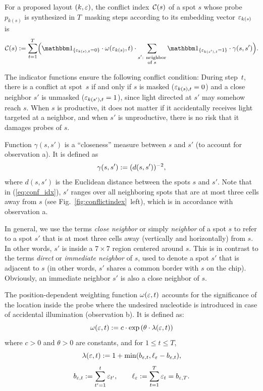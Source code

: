 For a proposed layout $(k,\varepsilon)$, the conflict index~${\mathcal{C}}(s)$ of a spot $s$
whose probe $p_{k(s)}$ is synthesized in $T$~masking steps according to its
embedding vector $\varepsilon_{k(s)}$ is
\begin{equation}
\label{eq:conf_idx}
\CalC(s) := \sum_{t=1}^{T} \Bigl(
  \Ind{\eps_{k(s),t}=0}
  \cdot \omega(\eps_{k(s)},t)
  \cdot \sum_{\substack{s'\text{: neighbor}\\\text{of } s}}
  \Ind{\eps_{k(s'),t}=1}
  \cdot \gamma(s,s') \Bigr).
\end{equation}

The indicator functions ensure the following conflict condition: During
step~$t$, there is a conflict at spot~$s$ if and only if $s$ is masked
($\varepsilon_{k(s),t}=0$) and a close neighbor $s'$ is unmasked ($\varepsilon_{k(s'),t}=1$),
since light directed at $s'$ may somehow reach $s$.  When $s$ is productive, it
does not matter if it accidentally receives light targeted at a neighbor, and
when $s'$ is unproductive, there is no risk that it damages probes of $s$.

Function $\gamma(s,s')$ is a ``closeness'' measure between $s$ and $s'$ (to
account for observation a). It is defined as
\begin{equation}\label{eq:dist_weight}
\gamma(s,s') := (d(s,s'))^{-2},\nopagebreak
\end{equation}\nopagebreak
where $d(s,s')$ is the Euclidean distance between the spots $s$ and $s'$. Note
that in (\ref{eq:conf_idx}), $s'$ ranges over all neighboring spots that are at
most three cells away from $s$ (see Fig.~\ref{fig:conflictindex}~left), which is
in accordance with observation a.

In general, we use the terms \emph{close neighbor} or simply \emph{neighbor} of
a spot $s$ to refer to a spot $s'$ that is at most three cells away (vertically
and horizontally) from $s$. In other words, $s'$ is inside a $7\times 7$ region
centered around $s$. This is in contrast to the terms \emph{direct} or \emph{
immediate neighbor} of $s$, used to denote a spot $s'$ that is adjacent to $s$
(in other words, $s'$ shares a common border with $s$ on the chip). Obviously,
an immediate neighbor $s'$ is also a close neighbor of $s$.

The position-dependent weighting function $\omega(\varepsilon,t)$ accounts for the
significance of the location inside the probe where the undesired nucleotide is
introduced in case of accidental illumination (observation b). It is defined as:
\begin{equation}\label{eq:pos_mult}
\omega(\varepsilon,t) := c \cdot \exp{\left(\theta \cdot \lambda(\varepsilon,t)\right)}
\end{equation}
where $c>0$ and $\theta>0$ are constants, and for $1\leq t\leq T$,
\begin{equation}\label{eq:base_pos}
  \lambda(\varepsilon,t) := 1 + \min(b_{\varepsilon,t},\ell_{\varepsilon} - b_{\varepsilon,t}),
\end{equation}
\begin{equation}\label{eq:b_ell}
  b_{\varepsilon,t} := \sum_{t'=1}^{t} \varepsilon_{t'},
  \qquad
  \ell_{\varepsilon} := \sum_{t=1}^{T} \varepsilon_t = b_{\varepsilon,T}.
\end{equation}

